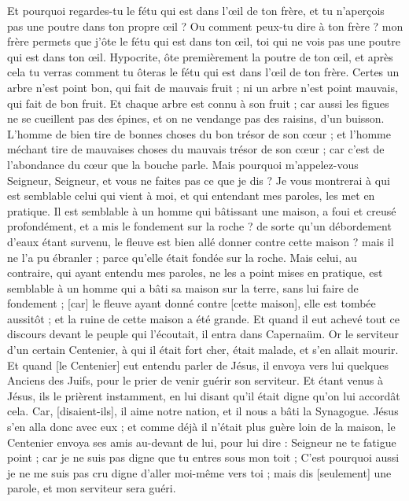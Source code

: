 \begin{multicols}{2}
Et pourquoi regardes-tu le fétu qui est dans l'œil de ton frère, et tu n'aperçois pas une poutre dans ton propre œil ?
Ou comment peux-tu dire à ton frère ? mon frère permets que j'ôte le fétu qui est dans ton œil, toi qui ne vois pas une poutre qui est dans ton œil. Hypocrite, ôte premièrement la poutre de ton œil, et après cela tu verras comment tu ôteras le fétu qui est dans l'œil de ton frère.
Certes un arbre n'est point bon, qui fait de mauvais fruit ; ni un arbre n'est point mauvais, qui fait de bon fruit.
Et chaque arbre est connu à son fruit ; car aussi les figues ne se cueillent pas des épines, et on ne vendange pas des raisins, d'un buisson.
L'homme de bien tire de bonnes choses du bon trésor de son cœur ; et l'homme méchant tire de mauvaises choses du mauvais trésor de son cœur ; car c'est de l'abondance du cœur que la bouche parle.
Mais pourquoi m'appelez-vous Seigneur, Seigneur, et vous ne faites pas ce que je dis ?
Je vous montrerai à qui est semblable celui qui vient à moi, et qui entendant mes paroles, les met en pratique.
Il est semblable à un homme qui bâtissant une maison, a foui et creusé profondément, et a mis le fondement sur la roche ? de sorte qu'un débordement d'eaux étant survenu, le fleuve est bien allé donner contre cette maison ? mais il ne l'a pu ébranler ; parce qu'elle était fondée sur la roche.
Mais celui, au contraire, qui ayant entendu mes paroles, ne les a point mises en pratique, est semblable à un homme qui a bâti sa maison sur la terre, sans lui faire de fondement ; [car] le fleuve ayant donné contre [cette maison], elle est tombée aussitôt ; et la ruine de cette maison a été grande.
\VerseOne{}Et quand il eut achevé tout ce discours devant le peuple qui l'écoutait, il entra dans Capernaüm.
Or le serviteur d'un certain Centenier, à qui il était fort cher, était malade, et s'en allait mourir.
Et quand [le Centenier] eut entendu parler de Jésus, il envoya vers lui quelques Anciens des Juifs, pour le prier de venir guérir son serviteur.
Et étant venus à Jésus, ils le prièrent instamment, en lui disant qu'il était digne qu'on lui accordât cela.
Car, [disaient-ils], il aime notre nation, et il nous a bâti la Synagogue.
Jésus s'en alla donc avec eux ; et comme déjà il n'était plus guère loin de la maison, le Centenier envoya ses amis au-devant de lui, pour lui dire : Seigneur ne te fatigue point ; car je ne suis pas digne que tu entres sous mon toit ;
C'est pourquoi aussi je ne me suis pas cru digne d'aller moi-même vers toi ; mais dis [seulement] une parole, et mon serviteur sera guéri.

\end{multicols}
